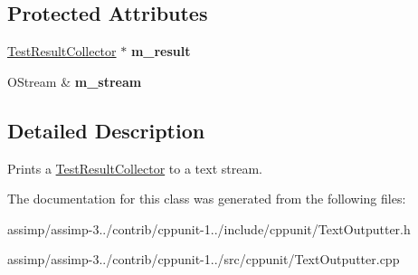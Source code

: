 \subsection*{Protected Attributes}
\begin{DoxyCompactItemize}
\item 
\hypertarget{class_text_outputter_adca3779bc6090231e6cc255f098eda94}{\hyperlink{class_test_result_collector}{Test\+Result\+Collector} $\ast$ {\bfseries m\+\_\+result}}\label{class_text_outputter_adca3779bc6090231e6cc255f098eda94}

\item 
\hypertarget{class_text_outputter_a3143002e4fff8199875d7beae0b887d0}{O\+Stream \& {\bfseries m\+\_\+stream}}\label{class_text_outputter_a3143002e4fff8199875d7beae0b887d0}

\end{DoxyCompactItemize}


\subsection{Detailed Description}
Prints a \hyperlink{class_test_result_collector}{Test\+Result\+Collector} to a text stream. 

The documentation for this class was generated from the following files\+:\begin{DoxyCompactItemize}
\item 
assimp/assimp-\/3../contrib/cppunit-\/1../include/cppunit/Text\+Outputter.\+h\item 
assimp/assimp-\/3../contrib/cppunit-\/1../src/cppunit/Text\+Outputter.\+cpp\end{DoxyCompactItemize}
